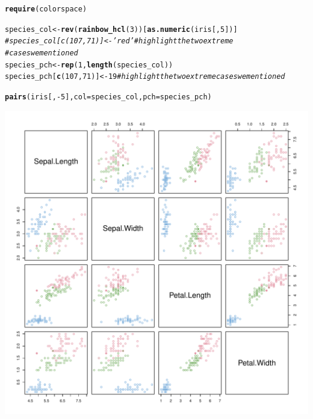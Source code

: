 \documentclass[shortnames,nojss,article]{jss}\usepackage[]{graphicx}\usepackage[]{color}
\makeatletter
\def\maxwidth{ %
  \ifdim\Gin@nat@width>\linewidth
    \linewidth
  \else
    \Gin@nat@width
  \fi
}
\newcommand{\hlnum}[1]{\textcolor[rgb]{0.686,0.059,0.569}{#1}}%
\newcommand{\hlcom}[1]{\textcolor[rgb]{0.678,0.584,0.686}{\textit{#1}}}%
\newcommand{\hlopt}[1]{\textcolor[rgb]{0,0,0}{#1}}%
\newcommand{\hlstd}[1]{\textcolor[rgb]{0.345,0.345,0.345}{#1}}%
\newcommand{\hlkwb}[1]{\textcolor[rgb]{0.69,0.353,0.396}{#1}}%
\newcommand{\hlkwc}[1]{\textcolor[rgb]{0.333,0.667,0.333}{#1}}%
\newcommand{\hlkwd}[1]{\textcolor[rgb]{0.737,0.353,0.396}{\textbf{#1}}}%
\newenvironment{kframe}{%
 \def\at@end@of@kframe{}%
 \ifinner\ifhmode%
  \def\at@end@of@kframe{\end{minipage}}%
  \begin{minipage}{\columnwidth}%
 \fi\fi%
 \def\FrameCommand##1{\hskip\@totalleftmargin \hskip-\fboxsep
 \colorbox{shadecolor}{##1}\hskip-\fboxsep
     \hskip-\linewidth \hskip-\@totalleftmargin \hskip\columnwidth}%
 \MakeFramed {\advance\hsize-\width
   \@totalleftmargin\z@ \linewidth\hsize
   \@setminipage}}%
 {\par\unskip\endMakeFramed%
 \at@end@of@kframe}
\newenvironment{knitrout}{}{} %
\makeatother
\begin{document}
\begin{knitrout}
\color{fgcolor}\begin{kframe}
\begin{alltt}
\hlkwd{require}\hlstd{(colorspace}\hlstd{)}

\hlstd{species_col} \hlkwb{<-} \hlkwd{rev}\hlstd{(}\hlkwd{rainbow_hcl}\hlstd{(}\hlnum{3}\hlstd{))[}\hlkwd{as.numeric}\hlstd{(iris[,} \hlnum{5}\hlstd{])]}
\hlcom{# species_col[c(107,71)] <- 'red' # highlight the two extreme}
\hlcom{# cases we mentioned}
\hlstd{species_pch} \hlkwb{<-} \hlkwd{rep}\hlstd{(}\hlnum{1}\hlstd{,} \hlkwd{length}\hlstd{(species_col))}
\hlstd{species_pch[}\hlkwd{c}\hlstd{(}\hlnum{107}\hlstd{,} \hlnum{71}\hlstd{)]} \hlkwb{<-} \hlnum{19}  \hlcom{# highlight the two extreme cases we mentioned}

\hlkwd{pairs}\hlstd{(iris[,} \hlopt{-}\hlnum{5}\hlstd{],} \hlkwc{col} \hlstd{= species_col,} \hlkwc{pch} \hlstd{= species_pch)}
\end{alltt}
\end{kframe}

{\centering \includegraphics[width=\maxwidth]{figure/iris_colored_pairs_plot} 

}


\begin{kframe}\begin{alltt}

\end{alltt}
\end{kframe}
\end{knitrout}
\end{document}

